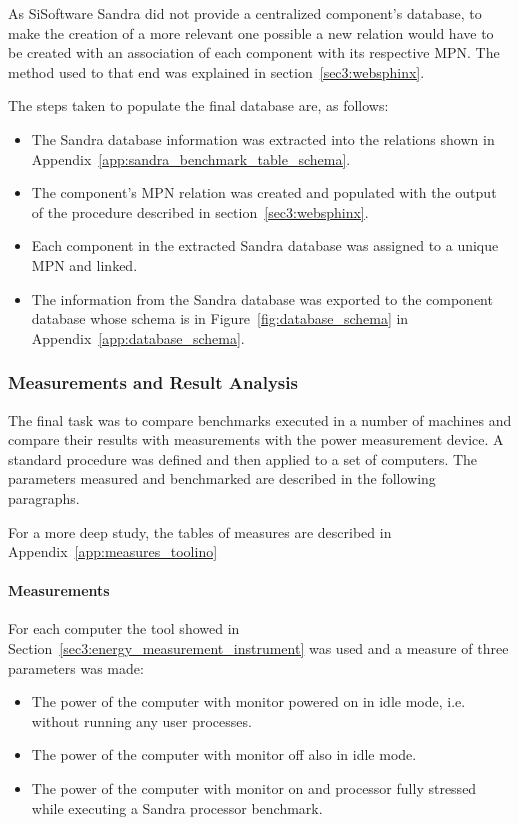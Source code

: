         As SiSoftware Sandra did not provide a centralized component's database, to make the creation of a more relevant one possible a new relation would have to be created with an association of each component with its respective MPN. The method used to that end was explained in section~\ref{sec3:websphinx}.
    
        The steps taken to populate the final database are, as follows:
        \begin{itemize}
            \item The Sandra database information was extracted into the relations shown in Appendix~\ref{app:sandra_benchmark_table_schema}.
            \item The component's MPN relation was created and populated with the output of the procedure described in section~\ref{sec3:websphinx}.
            \item Each component in the extracted Sandra database was assigned to a unique MPN and linked.
            \item The information from the Sandra database was exported to the component database whose schema is in Figure~\ref{fig:database_schema} in Appendix~\ref{app:database_schema}.
        \end{itemize}
    
    \subsubsection*{Measurements and Result Analysis}
        The final task was to compare benchmarks executed in a number of machines and compare their results with measurements with the power measurement device. A standard procedure was defined and then applied to a set of computers. The parameters measured and benchmarked are described in the following paragraphs.
        
        For a more deep study, the tables of measures are described in Appendix~\ref{app:measures_toolino}

        \paragraph*{Measurements}
            For each computer the tool showed in Section~\ref{sec3:energy_measurement_instrument} was used and a measure of three parameters was made:
            \begin{itemize}
                \item The power of the computer with monitor powered on in idle mode, i.e. without running any user processes.
                \item The power of the computer with monitor off also in idle mode.
                \item The power of the computer with monitor on and processor fully stressed while executing a Sandra processor benchmark.
            \end{itemize}
            
